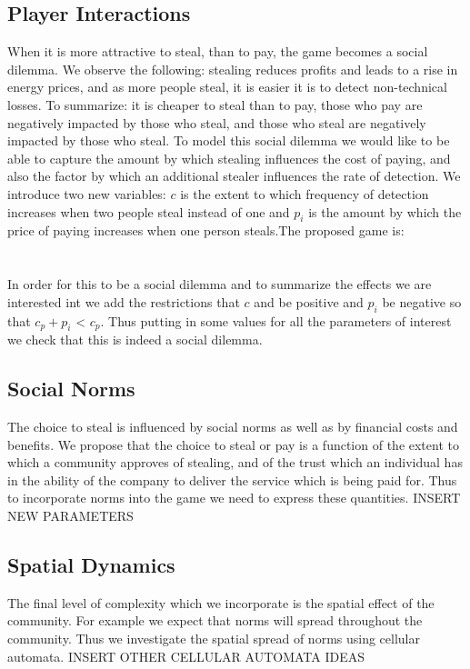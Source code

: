 \documentclass{article}
\begin{document}
\subsection{Player Interactions}
When it is more attractive to steal, than to pay, the game becomes a social dilemma. We observe the following: stealing reduces profits and leads to a rise in energy prices, and as more people steal, it is easier it is to detect non-technical losses. To summarize: it is cheaper to steal than to pay, those who pay are negatively impacted by those who steal, and those who steal are negatively impacted by those who steal. To model this social dilemma we would like to be able to capture the amount by which stealing influences the cost of paying, and also the factor by which an additional stealer influences the rate of detection. We introduce two new variables: $c$ is the extent to which frequency of detection increases when two people steal instead of one and $p_i$ is the amount by which the price of paying increases when one person steals.The proposed game is:\\ \\
\\
In order for this to be a social dilemma and to summarize the effects we are interested int we add the restrictions that $c$ and be positive and  $p_i$ be negative so that $c_p + p_i$ < $c_p$. Thus putting in some values for all the parameters of interest we check that this is indeed a social dilemma. 

\subsection{Social Norms}
The choice to steal is influenced by social norms as well as by financial costs and benefits. We propose that the choice to steal or pay is a function of the extent to which a community approves of stealing, and of the trust which an individual has in the ability of the company to deliver the service which is being paid for. Thus to incorporate norms into the game we need to express these quantities. INSERT NEW PARAMETERS

\subsection{Spatial Dynamics}
The final level of complexity which we incorporate is the spatial effect of the community. For example we expect that norms will spread throughout the community. Thus we investigate the spatial spread of norms using cellular automata. 
INSERT OTHER CELLULAR AUTOMATA IDEAS 
\end{document}
